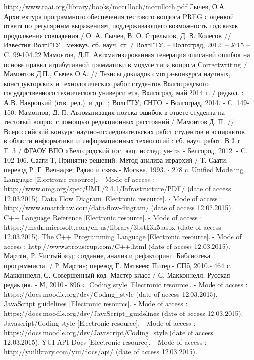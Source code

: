 \documentclass[a4paper,english,russian]{G2-105}
\begin{document}
\begin{thebibliography}{1}
     http://www.raai.org/library/books/mcculloch/mcculloch.pdf
 Сычев, О.А. Архитектура программного обеспечения тестового вопроса PREG с оценкой ответа по регулярным выражениям, поддерживающего возможность подсказок продолжения совпадения / О. А. Сычев, В. О. Стрельцов, Д. В. Колесов // Известия ВолгГТУ : межвуз. сб. науч. ст. / ВолгГТУ. – Волгоград, 2012. – №15 – C. 99-104.22
 Мамонтов, Д.П. Автоматизированная генерация описаний ошибок на основе правил атрибутивной грамматики в модуле типа вопроса Correctwriting / Мамонтов Д.П., Сычев О.А. // Тезисы докладов смотра-конкурса научных, конструкторских и технологических работ студентов Волгоградского государственного технического университета, Волгоград, май 2014 г. / редкол. : А.В. Навроцкий (отв. ред.) [и др.] ; ВолгГТУ, СНТО. - Волгоград, 2014. - C. 149-150.
 Мамонтов, Д. П. Автоматизация поиска ошибок в ответе студента на тестовый вопрос с помощью редакционных расстояний / Мамонтов Д. П. // Всероссийский конкурс научно-исследовательских работ студентов и аспирантов в области информатики и информационных технологий : сб. науч. работ. В 3 т. Т. 3 / ФГАОУ ВПО «Белгородский гос. нац. исслед. ун-т». - Белгород, 2012. - C. 102-106.
 Саати Т, Принятие решений: Метод анализа иерархий / Т. Саати; перевод Р. Г. Вачнадзе; Радио и связь.- Москва, 1993. - 278 c.
 Unified Modeling Language [Electronic resource]. – Mode of access : http://www.omg.org/spec/UML/2.4.1/Infrastructure/PDF/ (date of access 12.03.2015).
 Data Flow Diagram [Electronic resource]. - Mode of access : http://www.smartdraw.com/data-flow-diagram/ (date of access 12.03.2015).
 C++ Language Reference [Electronic resource]. - Mode of access : https://msdn.microsoft.com/en-us/library/3bstk3k5.aspx (date of access 12.03.2015).
 The C++ Programming Language [Electronic resource]. - Mode of access : http://www.stroustrup.com/C++.html (date of access 12.03.2015).
 Мартин, Р. Чистый код: создание, анализ и рефакторинг. Библиотека программиста. / Р. Мартин; перевод Е. Матвеев; Питер.- СПб, 2010.- 464 с.
 Макконнелл, С. Совершенный код. Мастер-класс / С. Макконнелл; Русская редакция. - М, 2010.- 896 с.
 Coding style [Electronic resource]. - Mode of access : https://docs.moodle.org/dev/Coding\_style (date of access 12.03.2015).
 JavaScript guidelines [Electronic resource]. - Mode of access : https://docs.moodle.org/dev/JavaScript\_guidelines (date of access 12.03.2015).
 Javascript/Coding style [Electronic resource]. - Mode of access : https://docs.moodle.org/dev/Javascript/Coding\_style (date of access 12.03.2015).
 YUI API Docs [Electronic resource]. - Mode of access : http://yuilibrary.com/yui/docs/api/ (date of access 12.03.2015).
\end{thebibliography}

\end{document}
